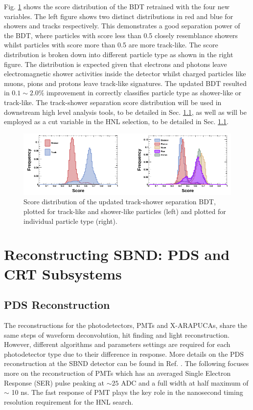 Fig. \ref{fig:bdt_score} shows the score distribution of the BDT retrained with the four new variables.
The left figure shows two distinct distributions in red and blue for showers and tracks respectively.
This demonstrates a good separation power of the BDT, where particles with score less than 0.5 closely resemblance showers whilst particles with score more than 0.5 are more track-like.
The score distribution is broken down into different particle type as shown in the right figure.
The distribution is expected given that electrons and photons leave electromagnetic shower activities inside the detector whilst charged particles like muons, pions and protons leave track-like signatures. 
The updated BDT resulted in $0.1\sim2.0\%$ improvement in correctly classifies particle type as shower-like or track-like.
The track-shower separation score distribution will be used in downstream high level analysis tools, to be detailed in Sec. \ref{}, as well as will be employed as a cut variable in the HNL selection, to be detailed in Sec. \ref{}.

\begin{figure}[htbp!]
        \centering
        \includegraphics[width=\textwidth]{bdt_score}
        \caption[bdt_score]{
	Score distribution of the updated track-shower separation BDT, plotted for track-like and shower-like particles (left) and plotted for individual particle type (right).
	}
        \label{fig:bdt_score}
\end{figure}

\section{Reconstructing SBND: PDS and CRT Subsystems}
\label{sec:reco_others}

\subsection{PDS Reconstruction}

The reconstructions for the photodetectors, PMTs and X-ARAPUCAs, share the same steps of waveform deconvolution, hit finding and light reconstruction.
However, different algorithms and parameters settings are required for each photodetector type due to their difference in response.
More details on the PDS reconstruction at the SBND detector can be found in Ref. \cite{}.
The following focuses more on the reconstruction of PMTs which has an averaged Single Electron Response (SER) pulse peaking at $\sim 25$ ADC and a full width at half maximum of $\sim$ 10 ns.
The fast response of PMT plays the key role in the nanosecond timing resolution requirement for the HNL search.

